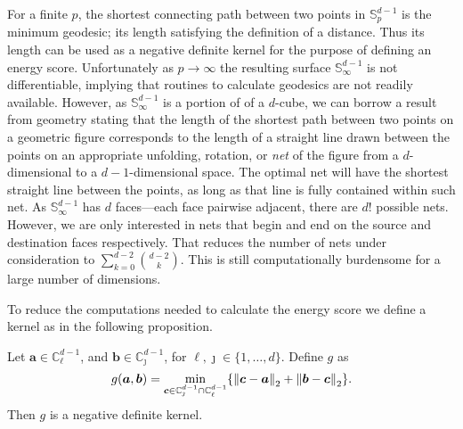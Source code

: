 For a finite $p$, the shortest connecting path between two points in ${\mathbb S}_p^{d-1}$
  is the minimum geodesic; its length satisfying the definition of a distance.  Thus its
  length can be used as a negative definite kernel for the purpose of defining an energy
  score. Unfortunately as $p\to\infty$ the resulting surface ${\mathbb S}_{\infty}^{d-1}$
  is not differentiable, implying that routines to calculate geodesics are not readily
  available.  However, as ${\mathbb S}_{\infty}^{d-1}$ is a portion of of a $d$-cube, we
  can borrow a result from geometry \citep{pappas1989} stating that the length of the
  shortest path between two points on a geometric figure corresponds to the length of a
  straight line drawn between the points on an appropriate unfolding, rotation, or \emph{net} of the figure from a $d$-dimensional to a $d-1$-dimensional space.  The optimal net will have the shortest straight line between the points, as long as that line is fully contained within such net. As ${\mathbb S}_{\infty}^{d-1}$ has $d$ faces---each face pairwise adjacent, there are $d!$ possible nets.  However, we are only interested in nets that begin and end on the source and destination faces respectively.  That reduces the number of nets under consideration to $\sum_{k = 0}^{d-2}\binom{d-2}{k}$.  This is still computationally burdensome for a large number of dimensions.  

To reduce the computations needed to calculate the energy score we define a kernel as 
in the following proposition.
\begin{prop}\label{prop:g}
Let $\bm{a} \in {\mathbb C}_{\ell}^{d-1}$, and $\bm{b} \in {\mathbb C}_{\jmath}^{d-1}$, for $\ell, \jmath \in \{1, \ldots , d\}$. Define $g$ as
\[  
    g(\bm{a},\bm{b}) = \min_{\bm{c} \in{\mathbb C}_{\jmath}^{d-1}\cap{\mathbb C}_{\ell}^{d-1}}\left\{ 
        \pnorm{\bm{c}-\bm{a}}{2} + \pnorm{\bm{b}-\bm{c}}{2} \right\}.
\]
Then $g$  is a negative definite kernel.
\end{prop}

